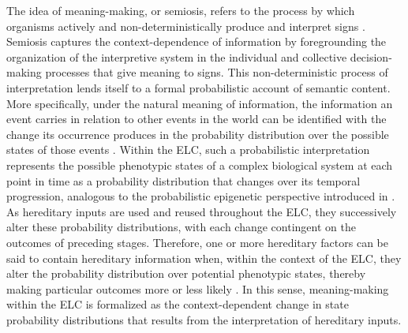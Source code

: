 \documentclass[pdflatex,sn-mathphys-num]{sn-jnl}
\theoremstyle{thmstylethree}
\theoremstyle{thmstyleone}
\begin{document}
The idea of meaning-making, or semiosis, refers to the process by which organisms actively and non-deterministically produce and interpret signs \cite{wolfe2026organisms}. Semiosis captures the context-dependence of information by foregrounding the organization of the interpretive system in the individual and collective decision-making processes that give meaning to signs. This non-deterministic process of interpretation lends itself to a formal probabilistic account of semantic content. More specifically, under the natural meaning of information, the information an event carries in relation to other events in the world can be identified with the change its occurrence produces in the probability distribution over the possible states of those events \cite{isaac2019semantics}. Within the ELC, such a probabilistic interpretation represents the possible phenotypic states of a complex biological system at each point in time as a probability distribution that changes over its temporal progression, analogous to the probabilistic epigenetic perspective introduced in \cite{rama2026probabilistic}. As hereditary inputs are used and reused throughout the ELC, they successively alter these probability distributions, with each change contingent on the outcomes of preceding stages. Therefore, one or more hereditary factors can be said to contain hereditary information when, within the context of the ELC, they alter the probability distribution over potential phenotypic states, thereby making particular outcomes more or less likely \cite{scarantino2015information}. In this sense, meaning-making within the ELC is formalized as the context-dependent change in state probability distributions that results from the interpretation of hereditary inputs.
\end{document}
